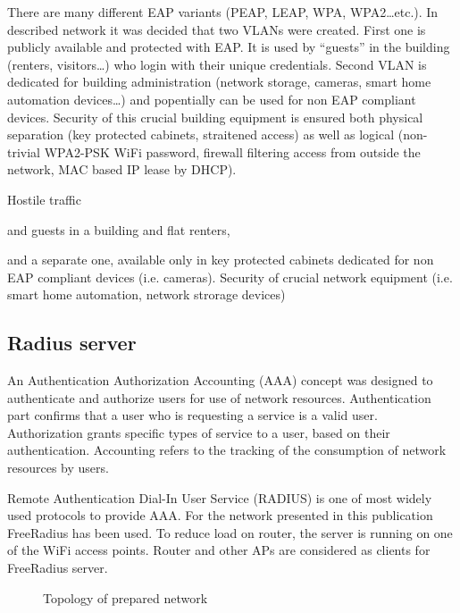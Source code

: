 \documentclass{llncs}
\begin{document}
There are many different EAP variants (PEAP, LEAP, WPA, WPA2\ldots etc.). 
In described network it was decided that two VLANs were created. First one is
publicly available and protected with EAP. It is used by ``guests'' in the building
(renters, visitors\ldots) who login with their unique credentials. Second VLAN
is dedicated for building administration (network storage, cameras, smart home
automation devices\ldots) and popentially can be used for non EAP compliant
devices. Security of this crucial building equipment is ensured both physical
separation (key protected cabinets, straitened access) as well as logical
(non-trivial WPA2-PSK WiFi password, firewall filtering access from outside the
network, MAC based IP lease by DHCP). 

Hostile traffic

and guests in a building and
flat renters,

 and a separate one, available only in
key protected cabinets dedicated for non EAP compliant devices (i.e. cameras).
Security of crucial network equipment (i.e. smart home automation, network
strorage devices)
 


\subsection{Radius server}
An Authentication Authorization Accounting (AAA) \cite{rfc2903}\cite{rfc2904}
concept was designed to authenticate and authorize users for use of network
resources. Authentication part confirms that a user who is requesting a service
is a valid user. Authorization grants specific types of service to a user, based
on their authentication. Accounting refers to the tracking of the consumption of
network resources by users.

Remote Authentication Dial-In User Service (RADIUS) \cite{rfc2865} is one of
most widely used protocols to provide AAA. For the network presented in this
publication FreeRadius \cite{freeRadius} has been used. To reduce load on
router, the server is running on one of the WiFi access points. Router and other
APs are considered as clients for FreeRadius server. 

\begin{figure}
\vspace{-15pt}
\caption{Topology of prepared network}
\end{figure}
\end{document}

